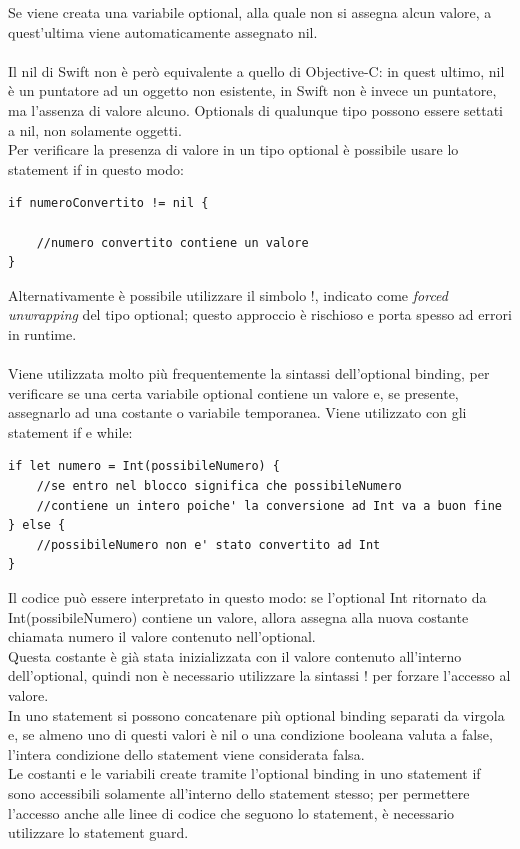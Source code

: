 Se viene creata una variabile optional, alla quale non si assegna alcun valore, a quest'ultima viene automaticamente assegnato nil.\\\\Il nil di Swift non è però equivalente a quello di Objective-C: in quest ultimo, nil è un puntatore ad un oggetto non esistente, in Swift non è invece un puntatore, ma l'assenza di valore alcuno. Optionals di qualunque tipo possono essere settati a nil, non solamente oggetti.\\
Per verificare la presenza di valore in un tipo optional è possibile usare lo statement if in questo modo: 
\lstset{language=[Objective]C, breakindent=40pt, breaklines}
\begin{lstlisting}
if numeroConvertito != nil {

	//numero convertito contiene un valore
}
\end{lstlisting}
Alternativamente è possibile utilizzare il simbolo !, indicato come \textit{forced unwrapping} del tipo optional; questo approccio è rischioso e porta spesso ad errori in runtime.
\\\\Viene utilizzata molto più frequentemente la sintassi dell'optional binding, per verificare se una certa variabile optional contiene un valore e, se presente, assegnarlo ad una costante o variabile temporanea. Viene utilizzato con gli statement if e while:
\begin{lstlisting}
if let numero = Int(possibileNumero) {
	//se entro nel blocco significa che possibileNumero 
	//contiene un intero poiche' la conversione ad Int va a buon fine
} else {
	//possibileNumero non e' stato convertito ad Int
}
\end{lstlisting}
Il codice può essere interpretato in questo modo: se l'optional Int ritornato da Int(possibileNumero) contiene un valore, allora assegna alla nuova costante chiamata numero il valore contenuto nell'optional. \\Questa costante è già stata inizializzata con il valore contenuto all'interno dell'optional, quindi non è necessario utilizzare la sintassi ! per forzare l'accesso al valore.\\In uno statement si possono concatenare più optional binding separati da virgola e, se almeno uno di questi valori è nil o una condizione booleana valuta a false, l'intera condizione dello statement viene considerata falsa.\\
Le costanti e le variabili create tramite l'optional binding in uno statement if sono accessibili solamente all'interno dello statement stesso; per permettere l'accesso anche alle linee di codice che seguono lo statement, è necessario utilizzare lo statement guard.\newpage
